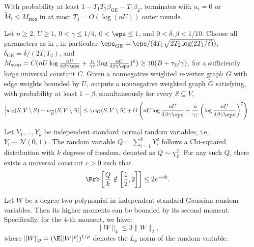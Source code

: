 \begin{lemma}\label{lem:outer_round}
With probability at least $1-T_1T_2\beta_{\mathrm{GE}}-T_1\beta_2$,  terminates with $a_i=0$ or $\widetilde{M}_i\leq M_{\mathsf{stop}}$ in at most $T_1 = O(\log(nU))$ outer rounds.
\end{lemma}

\begin{lemma}\label{lem:utility}
Let $n\geq2$, $U\geq1$, $0<\gamma\leq1/4$, $0<\eps\leq1$, and $0<\delta,\beta<1/10$.
Choose all parameters as in , in particular
$\eps_{\mathrm{GE}}=\eps/(4T_1\sqrt{2T_2\log(2T_1/\delta)})$,
$\delta_{\mathrm{GE}}=\delta/(2T_1T_2)$, and $M_{\mathrm{stop}}=C(nU\log\frac{nU}{\delta\beta\gamma\eps}+\frac{n}{\gamma\varepsilon}(\log\frac{nU}{\delta\beta\gamma\eps})^6)
\geq10(B+\tau_2/\gamma)$, for a sufficiently large universal constant $C$.
Given a nonnegative weighted $n$-vertex graph $G$ with edge weights bounded by $U$,  outputs a
nonnegative weighted graph $\widetilde{G}$ satisfying,
with probability at least $1-\beta$, simultaneously
for every $S\subseteq V$,
\begin{align*}
 \left|w_G(S,V\setminus S)-w_{\widetilde{G}}(S,V\setminus S)\right|
 \leq \gamma w_G(S,V\setminus S)  + O\left(nU\log\frac{nU}{\delta\beta\gamma\eps}+\frac{n}{\gamma\varepsilon}
 \left(\log\frac{nU}{\delta\beta\gamma\eps}\right)^7\right).
\end{align*}
\end{lemma}

\begin{lemma}\label{lem:chi_square_tail}
Let $Y_1, \dots, Y_k$ be independent standard normal random variables, i.e., $Y_i \sim \mathcal{N}(0, 1)$. The random variable $Q = \sum_{i=1}^k Y_i^2$ follows a Chi-squared distribution with $k$ degrees of freedom, denoted as $Q \sim \chi_k^2$. For any such $Q$, there exists a universal constant $c > 0$ such that
\[
 \Prb\left[\frac{Q}{k} \notin \left[\frac{1}{2}, 2\right]\right] \leq 2e^{-ck}.
\]
\end{lemma}

\begin{lemma}\label{lem:hypercontractivity}
Let $W$ be a degree-two polynomial in independent standard Gaussian random variables. Then its higher moments can be bounded by its second moment. Specifically, for the $4$-th moment, we have:
\[
    \|W\|_4 \le 3\|W\|_2,
\]
where $\|W\|_p = (\E[|W|^p])^{1/p}$ denotes the $L_p$ norm of the random variable.
\end{lemma}

